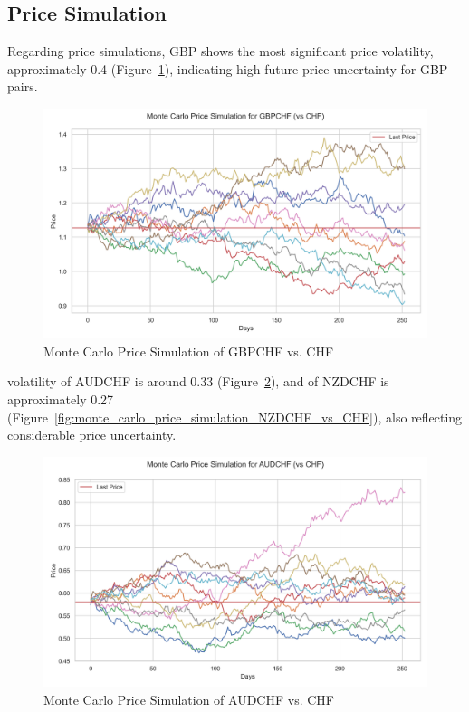 \documentclass{article}
\begin{document}
\subsection{Price Simulation}
Regarding price simulations, GBP shows the most significant price volatility, approximately 0.4 (Figure~\ref{fig:monte_carlo_price_simulation_GBPCHF_vs_CHF}), indicating high future price uncertainty for GBP pairs. 

\begin{figure}[h]
    \centering  \includegraphics[width=0.75\linewidth]{reports/figures/monte_carlo_price_simulation_GBPCHF_vs_CHF.png}
    \caption{Monte Carlo Price Simulation of GBPCHF vs. CHF}  \label{fig:monte_carlo_price_simulation_GBPCHF_vs_CHF}
\end{figure}

volatility of AUDCHF is around 0.33 (Figure~\ref{fig:monte_carlo_price_simulation_AUDCHF_vs_CHF}), and of NZDCHF is approximately 0.27 (Figure~\ref{fig:monte_carlo_price_simulation_NZDCHF_vs_CHF}), also reflecting considerable price uncertainty. 

\begin{figure}[h]
    \centering
    \includegraphics[width=0.75\linewidth]{reports/figures/monte_carlo_price_simulation_AUDCHF_vs_CHF.png}
    \caption{Monte Carlo Price Simulation of AUDCHF vs. CHF} \label{fig:monte_carlo_price_simulation_AUDCHF_vs_CHF}
\end{figure}
\end{document}
